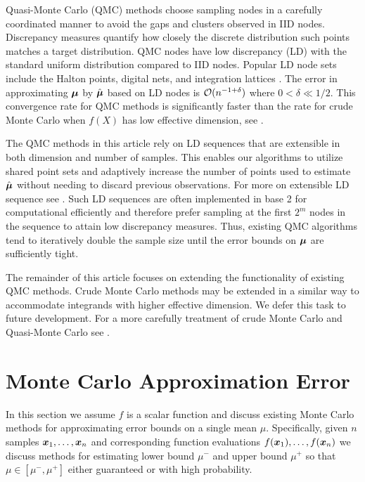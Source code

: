 \documentclass{article}[12pt]
\begin{document}
Quasi-Monte Carlo (QMC) methods choose sampling nodes in a carefully coordinated manner to avoid the gaps and clusters observed in IID nodes.  Discrepancy measures quantify how closely the discrete distribution such points matches a target distribution. QMC nodes have low discrepancy (LD) with the standard uniform distribution compared to IID nodes. Popular LD node sets include the Halton points, digital nets, and integration lattices . The error in approximating $\boldsymbol{\mu}$ by $\hat{\boldsymbol{\mu}}$ based on LD nodes is  $\mathcal{O}(n^{-1+\delta})$ where $0 < \delta \ll 1/2$. This convergence rate for QMC methods is significantly faster than the rate for crude Monte Carlo when $f(X)$ has low effective dimension, see . 

The QMC methods in this article rely on LD sequences that are extensible in both dimension and number of samples. This enables our algorithms to utilize shared point sets and adaptively increase the number of points used to estimate $\hat{\boldsymbol{\mu}}$ without needing to discard previous observations. For more on extensible LD sequence see . Such LD sequences are often implemented in base 2 for computational efficiently and therefore prefer sampling at the first $2^m$ nodes in the sequence to attain low discrepancy measures. Thus, existing QMC algorithms tend to iteratively  double the sample size until the error bounds on $\boldsymbol{\mu}$ are sufficiently tight. 

The remainder of this article focuses on extending the functionality of existing QMC methods. Crude Monte Carlo methods may be extended in a similar way to accommodate integrands with higher effective dimension. We defer this task to future development.  For a more carefully treatment of crude Monte Carlo and Quasi-Monte Carlo see \cite{mcbook}. 

\section{Monte Carlo Approximation Error}\label{sec:Existing_QMC_Methods}

In this section we assume $f$ is a scalar function and discuss existing Monte Carlo methods for approximating error bounds on a single mean $\mu$. Specifically, given $n$ samples $\boldsymbol{x}_1,\dots,\boldsymbol{x}_n$ and  corresponding function evaluations $f(\boldsymbol{x}_1),\dots,f(\boldsymbol{x}_n)$ we discuss methods for estimating lower bound $\mu^-$ and upper bound $\mu^+$ so that $\mu \in [\mu^-,\mu^+]$ either guaranteed or with high probability. 
\end{document}

